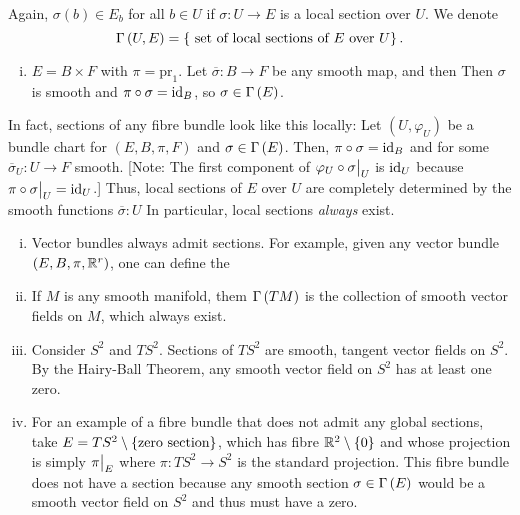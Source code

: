 \documentclass[main.tex]{subfiles}
\begin{document}
\begin{note}
Again, $\sigma(b) \in E_b$ for all $b \in U$ if $\sigma: U \to E$ is a local section over $U$. We denote \[
\Gamma\left( U,E \right) = \left\{ \text{ set of local sections of $E$ over $U$} \right\}.
\]
\end{note}

\begin{exmp}
\begin{enumerate}[(i)]
    \item $E = B \times F$ with $\pi = \text{pr}_1$. Let $\overline{\sigma}: B \to F$ be any smooth map, and then
    Then $\sigma$ is smooth and $\pi \circ \sigma = \text{id}_{B}$, so $\sigma \in \Gamma\left( E \right)$.
\end{enumerate}
\end{exmp}

In fact, sections of any fibre bundle look like this locally: Let $(U, \varphi_U)$ be a bundle chart for $(E, B, \pi, F)$ and $\sigma \in \Gamma\left( E \right)$. Then, $\pi \circ \sigma = \text{id}_{B}$ and 
for some $\overline{\sigma}_U : U \to F$ smooth. [Note: The first component of $\varphi_U \circ \sigma\big|_{U}$ is $\text{id}_{U}$ because $\pi \circ \sigma\big|_{U} = \text{id}_{U}$.] Thus, local sections of $E$ over $U$ are completely determined by the smooth functions $\overline{\sigma}: U$ In particular, local sections {\it always} exist.

\begin{exmp}
\begin{enumerate}[(i)]
    \item Vector bundles always admit sections. For example, given any vector bundle $(E, B, \pi, \mathbb{R}^r)$, one can define the 
    \item If $M$ is any smooth manifold, them $\Gamma\left( TM \right)$ is the collection of smooth vector fields on $M$, which always exist.
    
    \item Consider $S^2$ and $TS^2$. Sections of $TS^2$ are smooth, tangent vector fields on $S^2$. By the Hairy-Ball Theorem, any smooth vector field on $S^2$ has at least one zero.
    
    \item For an example of a fibre bundle that does not admit any global sections, take $E = TS^2 \setminus \left\{ \text{zero section}\right\}$, which has fibre $\mathbb{R}^2 \setminus \left\{0\right\}$ and whose projection is simply $\pi\big|_{E}$ where $\pi: TS^2 \to S^2$ is the standard projection. This fibre bundle does not have a section because any smooth section $\sigma \in \Gamma\left( E \right)$ would be a smooth vector field on $S^2$ and thus must have a zero.
\end{enumerate}
\end{exmp}
\end{document}
